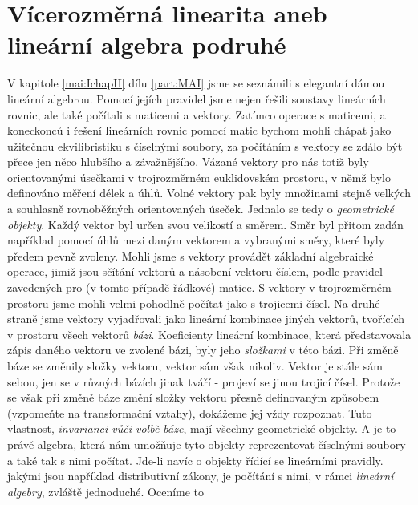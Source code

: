 \setchaptertoc
\chapter{Vícerozměrná linearita aneb lineární algebra podruhé}\label{mai:IIchapI}
  V kapitole \ref{mai:IchapII} dílu \ref{part:MAI} jsme se seznámili s elegantní dámou lineární
  algebrou. Pomocí jejích pravidel jsme nejen řešili soustavy lineárních rovnic, ale také počítali s
  maticemi a vektory. Zatímco operace s maticemi, a koneckonců i řešení lineárních rovnic pomocí
  matic bychom mohli chápat jako užitečnou ekvilibristiku s číselnými soubory, za počítáním s
  vektory se zdálo být přece jen něco hlubšího a závažnějšího. Vázané vektory pro nás totiž byly
  orientovanými úsečkami v trojrozměrném euklidovském prostoru, v němž bylo definováno měření délek
  a úhlů. Volné vektory pak byly množinami stejně velkých a souhlasně rovnoběžných orientovaných
  úseček. Jednalo se tedy o \emph{geometrické objekty}. Každý vektor byl určen svou velikostí a
  směrem. Směr byl přitom zadán například pomocí úhlů mezi daným vektorem a vybranými směry, které
  byly předem pevně zvoleny. Mohli jsme s vektory provádět základní algebraické operace, jimiž jsou
  sčítání vektorů a násobení vektoru číslem, podle pravidel zavedených pro (v tomto případě řádkové)
  matice. S vektory v trojrozměrném prostoru jsme mohli velmi pohodlně počítat jako s trojicemi
  čísel. Na druhé straně jsme vektory vyjadřovali jako lineární kombinace jiných vektorů, tvořících
  v prostoru všech vektorů \emph{bázi}. Koeficienty lineární kombinace, která představovala zápis
  daného vektoru ve zvolené bázi, byly jeho \emph{složkami} v této bázi. Při změně báze se změnily
  složky vektoru, vektor sám však nikoliv. Vektor je stále sám sebou, jen se v různých bázích jinak
  tváří - projeví se jinou trojicí čísel. Protože se však při změně báze změní složky vektoru přesně
  definovaným způsobem (vzpomeňte na transformační vztahy), dokážeme jej vždy rozpoznat. Tuto
  vlastnost, \emph{invarianci vůči volbě báze}, mají všechny geometrické objekty. A je to právě
  algebra, která nám umožňuje tyto objekty reprezentovat číselnými soubory a také tak s nimi
  počítat. Jde-li navíc o objekty řídící se lineárními pravidly. jakými jsou například distributivní
  zákony, je počítání s nimi, v rámci \emph{lineární algebry}, zvláště jednoduché. Oceníme to
